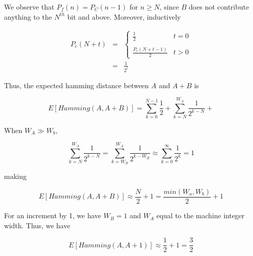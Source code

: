 We observe that $P_f(n) = P_C(n - 1)$ for $n \geq N$, since $B$ does
not contribute anything to the $N^{th}$ bit and above.  Moreover,
inductively

\begin{eqnarray*}
  P_c(N + t) & = &
  \begin{cases}
    \frac{1}{2} & t = 0 \\
    \\
    \frac{P_c(N + t - 1)}{2} & t > 0
  \end{cases} \\
  & = & \frac{1}{2^t}
\end{eqnarray*}

Thus, the expected hamming distance between $A$ and $A + B$ is

\begin{equation}
  E[Hamming(A, A + B)] = \displaystyle\sum\limits_{k=0}^{N - 1} \frac{1}{2} + 
  \displaystyle\sum\limits_{k=N}^{W_A} \frac{1}{2^{k - N}} + 
\end{equation}

When $W_A \gg W_b$, 

\begin{equation}
  \displaystyle\sum\limits_{k=N}^{W_A} \frac{1}{2^{k - N}} = 
  \displaystyle\sum\limits_{k=W_B}^{W_A} \frac{1}{2^{k - W_B}} \approx
  \displaystyle\sum\limits_{k=0}^{\infty} \frac{1}{2^k} = 1
\end{equation}

making

\begin{equation}
  E[Hamming(A, A + B)] \approx \frac{N}{2} + 1 = 
  \frac{min(W_a, W_b)}{2} + 1
\end{equation}

For an increment by 1, we have $W_B = 1$ and $W_A$ equal to the
machine integer width.  Thus, we have

\begin{equation}
  \label{proof:average-2-flips}
  E[Hamming(A, A + 1)] \approx \frac{1}{2} + 1 = \frac{3}{2}
\end{equation}
